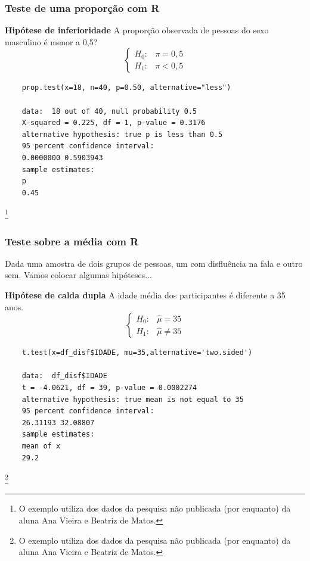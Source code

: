 \documentclass[graphics,14pt]{beamer}
\newcommand{\lfr}[1]{\let\thefootnote\relax\footnote{\hspace{0.6cm}\vspace{1.25cm} #1}}
\begin{document}
\begin{frame}[t,fragile=singleslide]
\frametitle{Teste de uma proporção com R}
	\textbf{Hipótese de inferioridade}
	A proporção observada de pessoas do sexo masculino é menor a 0,5?
	\begin{equation*}
	\left\{ \begin{array}{cl}
	H_0: & \pi = 0,5 \\
	H_1: & \pi < 0,5
	\end{array}\right.
	\end{equation*}
	
	\begin{lstlisting}
	prop.test(x=18, n=40, p=0.50, alternative="less")
	
	data:  18 out of 40, null probability 0.5
	X-squared = 0.225, df = 1, p-value = 0.3176
	alternative hypothesis: true p is less than 0.5
	95 percent confidence interval:
	0.0000000 0.5903943
	sample estimates:
	p 
	0.45 
	\end{lstlisting}

\lfr{O exemplo utiliza dos dados da pesquisa não publicada (por enquanto) da aluna Ana Vieira e Beatriz de Matos.}
\end{frame}
\begin{frame}[t,fragile=singleslide]
\frametitle{Teste sobre a média com R}
	Dada uma amostra de dois grupos de pessoas, um com disfluência na fala e outro sem. Vamos colocar algumas hipóteses...
	
	\textbf{Hipótese de calda dupla}
	A idade média dos participantes é diferente a 35 anos.
	\begin{equation*}
	\left\{ \begin{array}{cl}
	H_0: & \hat{\mu} = 35 \\
	H_1: & \hat{\mu} \neq 35
	\end{array}\right.
	\end{equation*}
	
	\begin{lstlisting}
	t.test(x=df_disf$IDADE, mu=35,alternative='two.sided')
	
	data:  df_disf$IDADE
	t = -4.0621, df = 39, p-value = 0.0002274
	alternative hypothesis: true mean is not equal to 35
	95 percent confidence interval:
	26.31193 32.08807
	sample estimates:
	mean of x 
	29.2  
	\end{lstlisting}
	
	\lfr{O exemplo utiliza dos dados da pesquisa não publicada (por enquanto) da aluna Ana Vieira e Beatriz de Matos.}

\end{frame}
\end{document}
